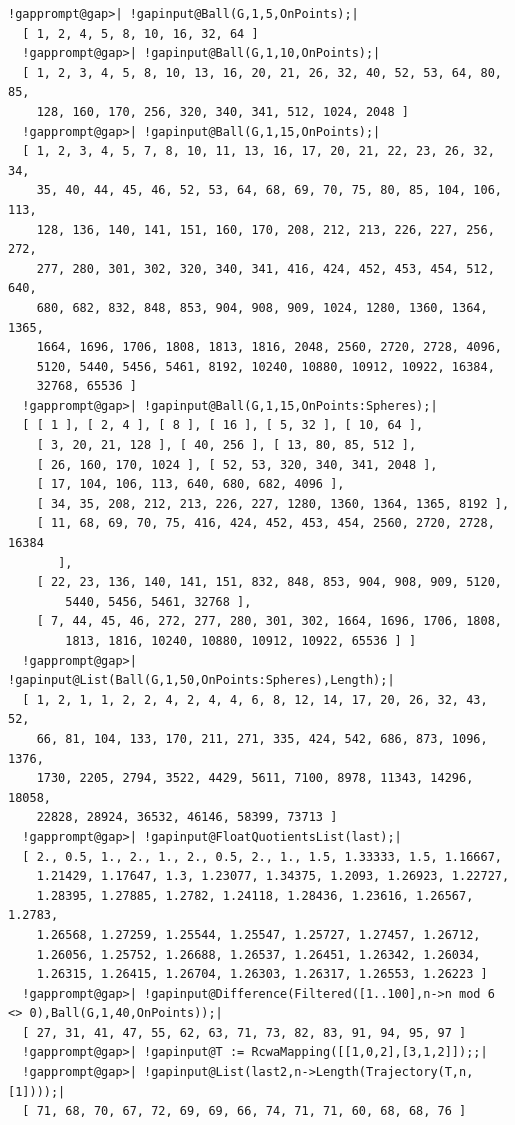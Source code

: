 \documentclass[a4paper,11pt]{report}
\begin{document}
{{\begin{Verbatim}[commandchars=!@|,fontsize=\small,frame=single,label=Example]
  !gapprompt@gap>| !gapinput@Ball(G,1,5,OnPoints);|
  [ 1, 2, 4, 5, 8, 10, 16, 32, 64 ]
  !gapprompt@gap>| !gapinput@Ball(G,1,10,OnPoints);|
  [ 1, 2, 3, 4, 5, 8, 10, 13, 16, 20, 21, 26, 32, 40, 52, 53, 64, 80, 85, 
    128, 160, 170, 256, 320, 340, 341, 512, 1024, 2048 ]
  !gapprompt@gap>| !gapinput@Ball(G,1,15,OnPoints);|
  [ 1, 2, 3, 4, 5, 7, 8, 10, 11, 13, 16, 17, 20, 21, 22, 23, 26, 32, 34, 
    35, 40, 44, 45, 46, 52, 53, 64, 68, 69, 70, 75, 80, 85, 104, 106, 113, 
    128, 136, 140, 141, 151, 160, 170, 208, 212, 213, 226, 227, 256, 272, 
    277, 280, 301, 302, 320, 340, 341, 416, 424, 452, 453, 454, 512, 640, 
    680, 682, 832, 848, 853, 904, 908, 909, 1024, 1280, 1360, 1364, 1365, 
    1664, 1696, 1706, 1808, 1813, 1816, 2048, 2560, 2720, 2728, 4096, 
    5120, 5440, 5456, 5461, 8192, 10240, 10880, 10912, 10922, 16384, 
    32768, 65536 ]
  !gapprompt@gap>| !gapinput@Ball(G,1,15,OnPoints:Spheres);|
  [ [ 1 ], [ 2, 4 ], [ 8 ], [ 16 ], [ 5, 32 ], [ 10, 64 ], 
    [ 3, 20, 21, 128 ], [ 40, 256 ], [ 13, 80, 85, 512 ], 
    [ 26, 160, 170, 1024 ], [ 52, 53, 320, 340, 341, 2048 ], 
    [ 17, 104, 106, 113, 640, 680, 682, 4096 ], 
    [ 34, 35, 208, 212, 213, 226, 227, 1280, 1360, 1364, 1365, 8192 ], 
    [ 11, 68, 69, 70, 75, 416, 424, 452, 453, 454, 2560, 2720, 2728, 16384 
       ], 
    [ 22, 23, 136, 140, 141, 151, 832, 848, 853, 904, 908, 909, 5120, 
        5440, 5456, 5461, 32768 ], 
    [ 7, 44, 45, 46, 272, 277, 280, 301, 302, 1664, 1696, 1706, 1808, 
        1813, 1816, 10240, 10880, 10912, 10922, 65536 ] ]
  !gapprompt@gap>| !gapinput@List(Ball(G,1,50,OnPoints:Spheres),Length);|
  [ 1, 2, 1, 1, 2, 2, 4, 2, 4, 4, 6, 8, 12, 14, 17, 20, 26, 32, 43, 52, 
    66, 81, 104, 133, 170, 211, 271, 335, 424, 542, 686, 873, 1096, 1376, 
    1730, 2205, 2794, 3522, 4429, 5611, 7100, 8978, 11343, 14296, 18058, 
    22828, 28924, 36532, 46146, 58399, 73713 ]
  !gapprompt@gap>| !gapinput@FloatQuotientsList(last);|
  [ 2., 0.5, 1., 2., 1., 2., 0.5, 2., 1., 1.5, 1.33333, 1.5, 1.16667, 
    1.21429, 1.17647, 1.3, 1.23077, 1.34375, 1.2093, 1.26923, 1.22727, 
    1.28395, 1.27885, 1.2782, 1.24118, 1.28436, 1.23616, 1.26567, 1.2783, 
    1.26568, 1.27259, 1.25544, 1.25547, 1.25727, 1.27457, 1.26712, 
    1.26056, 1.25752, 1.26688, 1.26537, 1.26451, 1.26342, 1.26034, 
    1.26315, 1.26415, 1.26704, 1.26303, 1.26317, 1.26553, 1.26223 ]
  !gapprompt@gap>| !gapinput@Difference(Filtered([1..100],n->n mod 6 <> 0),Ball(G,1,40,OnPoints));|
  [ 27, 31, 41, 47, 55, 62, 63, 71, 73, 82, 83, 91, 94, 95, 97 ]
  !gapprompt@gap>| !gapinput@T := RcwaMapping([[1,0,2],[3,1,2]]);;|
  !gapprompt@gap>| !gapinput@List(last2,n->Length(Trajectory(T,n,[1])));|
  [ 71, 68, 70, 67, 72, 69, 69, 66, 74, 71, 71, 60, 68, 68, 76 ]
  

\end{Verbatim}}}
\end{document}
